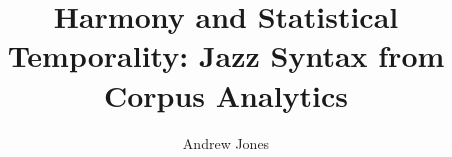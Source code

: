 \documentclass[12pt,titlepage]{report}
\begin{document}
\author{Andrew Jones}
\title{Harmony and Statistical Temporality: Jazz Syntax from Corpus Analytics}
\maketitle
%
\setcounter{page}{1}
\tableofcontents
\newpage
\listoffigures
\newpage
%
\setcounter{page}{1}


\end{document}
